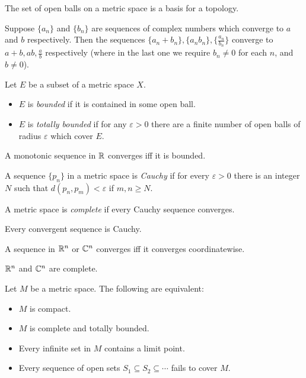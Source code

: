 \begin{prop}
    The set of open balls on a metric space is a basis for a topology.
\end{prop}
\begin{prop}
  Suppose $\{a_n\}$ and $\{b_n\}$ are sequences of complex numbers which
  converge to $a$ and $b$ respectively. Then the sequences $\{a_n+b_n\},
  \{a_n b_n\},\{\frac{a_n}{b_n}\}$ converge to $a+b,ab,\frac ab$
  respectively (where in the last one we require $b_n\ne 0$ for each $n$, and
  $b\ne 0$).
\end{prop}
\begin{defn}
    Let $E$ be a subset of a metric space $X$.
    \begin{itemize}
        \item $E$ is \emph{bounded} if it is contained in some open ball.
        \item $E$ is \emph{totally bounded} if for any $\varepsilon>0$ there are a
            finite number of open balls of radius $\varepsilon$ which cover $E$.
    \end{itemize}
\end{defn}
\begin{thm}
    A monotonic sequence in $\mathbb{R}$ converges iff it is bounded.
\end{thm}
\begin{defn}
  A sequence $\{p_n\}$ in a metric space is \emph{Cauchy} if for every
  $\varepsilon>0$ there is an integer $N$ such that $d(p_n,p_m)<\varepsilon$ if
  $m,n\ge N$.

  A metric space is \emph{complete} if every Cauchy sequence converges.
\end{defn}
\begin{prop}
  Every convergent sequence is Cauchy.
\end{prop}
\begin{prop}
  A sequence in $\mathbb{R}^n$ or $\mathbb{C}^n$ converges iff it converges coordinatewise.
\end{prop}
\begin{cor}
  $\mathbb{R}^n$ and $\mathbb{C}^n$ are complete.
\end{cor}
\begin{prop}
    Let $M$ be a metric space. The following are equivalent:
    \begin{itemize}
        \item $M$ is compact.
        \item $M$ is complete and totally bounded.
        \item Every infinite set in $M$ contains a limit point.
        \item Every sequence of open sets $S_1\subseteq S_2\subseteq\cdots$
            fails to cover $M$.
    \end{itemize}
\end{prop}
